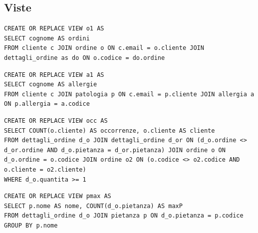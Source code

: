 \documentclass[10pt]{article}
\begin{document}
	\subsection{Viste}
	\begin{lstlisting}[style=Mysql]
CREATE OR REPLACE VIEW o1 AS
SELECT cognome AS ordini
FROM cliente c JOIN ordine o ON c.email = o.cliente JOIN dettagli_ordine as do ON o.codice = do.ordine \end{lstlisting}
\begin{lstlisting}[style=Mysql]
CREATE OR REPLACE VIEW a1 AS
SELECT cognome AS allergie
FROM cliente c JOIN patologia p ON c.email = p.cliente JOIN allergia a ON p.allergia = a.codice \end{lstlisting}
\begin{lstlisting}[style=Mysql]
CREATE OR REPLACE VIEW occ AS
SELECT COUNT(o.cliente) AS occorrenze, o.cliente AS cliente 
FROM dettagli_ordine d_o JOIN dettagli_ordine d_or ON (d_o.ordine <> d_or.ordine AND d_o.pietanza = d_or.pietanza) JOIN ordine o ON d_o.ordine = o.codice JOIN ordine o2 ON (o.codice <> o2.codice AND o.cliente = o2.cliente) 
WHERE d_o.quantita >= 1 \end{lstlisting}
\begin{lstlisting}[style=Mysql]
CREATE OR REPLACE VIEW pmax AS
SELECT p.nome AS nome, COUNT(d_o.pietanza) AS maxP
FROM dettagli_ordine d_o JOIN pietanza p ON d_o.pietanza = p.codice
GROUP BY p.nome \end{lstlisting}
\end{document}
